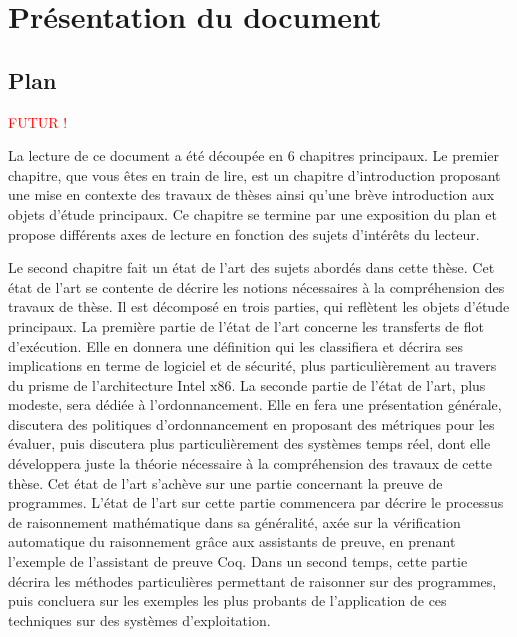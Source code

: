 \section{Présentation du document}

\subsection{Plan}

\textcolor{red}{FUTUR !}

La lecture de ce document a été découpée en 6 chapitres principaux. Le premier chapitre, que vous êtes en train de lire, est un chapitre d'introduction proposant une mise en contexte des travaux de thèses ainsi qu'une brève introduction aux objets d'étude principaux. Ce chapitre se termine par une exposition du plan et propose différents axes de lecture en fonction des sujets d'intérêts du lecteur.

Le second chapitre fait un état de l'art des sujets abordés dans cette thèse. Cet état de l'art se contente de décrire les notions nécessaires à la compréhension des travaux de thèse. Il est décomposé en trois parties, qui reflètent les objets d'étude principaux. La première partie de l'état de l'art concerne les transferts de flot d'exécution. Elle en donnera une définition qui les classifiera et décrira ses implications en terme de logiciel et de sécurité, plus particulièrement au travers du prisme de l'architecture Intel x86. La seconde partie de l'état de l'art, plus modeste, sera dédiée à l'ordonnancement. Elle en fera une présentation générale, discutera des politiques d'ordonnancement en proposant des métriques pour les évaluer, puis discutera plus particulièrement des systèmes temps réel, dont elle développera juste la théorie nécessaire à la compréhension des travaux de cette thèse. Cet état de l'art s'achève sur une partie concernant la preuve de programmes. L'état de l'art sur cette partie commencera par décrire le processus de raisonnement mathématique dans sa généralité, axée sur la vérification automatique du raisonnement grâce aux assistants de preuve, en prenant l'exemple de l'assistant de preuve Coq. Dans un second temps, cette partie décrira les méthodes particulières permettant de raisonner sur des programmes, puis concluera sur les exemples les plus probants de l'application de ces techniques sur des systèmes d'exploitation.

